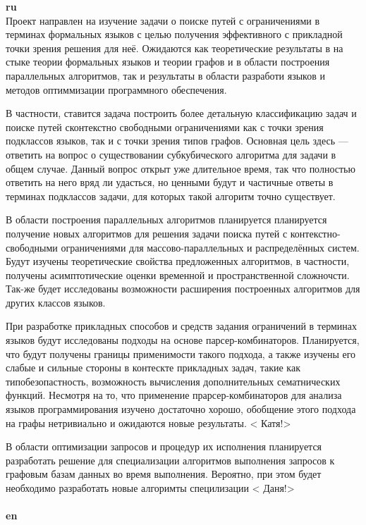 \documentclass[12pt]{article}  %
\theoremstyle{remark}
\begin{document}
\textbf{ru}\\
%
Проект направлен на изучение задачи о поиске путей с ограничениями в терминах формальных языков с целью получения эффективного с прикладной точки зрения решения для неё.
Ожидаются как теоретические результаты в на стыке теории формальных языков и теории графов и в области построения параллельных алгоритмов, так и результаты в области разработи языков и методов оптиммизации программного обеспечения.

В частности, ставится задача построить более детальную классификацию задач и поиске путей сконтекстно свободными ограничениями как с точки зрения подклассов языков, так и с точки зрения типов графов.
Основная цель здесь --- ответить на вопрос о существовании субкубического алгоритма для задачи в общем случае.
Данный вопрос открыт уже длительное время, так что полностью ответить на него вряд ли удасться, но ценными будут и частичные ответы в терминах подклассов задачи, для которых такой алгоритм точно существует.

В области построения параллельных алгоритмов планируется планируется получение новых алгоритмов для решения задачи поиска путей с контекстно-свободными ограничениями для массово-параллельных и распределённых систем.
Будут изучены теоретические свойства предложенных алгоритмов, в частности, получены асимптотические оценки временной и пространственной сложночсти.
Так-же будет исследованы возможности расширения построенных алгоритмов для других классов языков.

При разработке прикладных способов и средств задания ограничений в терминах языков будут исследованы подходы на основе парсер-комбинаторов.
Планируется, что будут получены границы применимости такого подхода, а также изучены его слабые и сильные стороны в контескте прикладных задач, такие как типобезопастность, возможность вычисления дополнительных сематнических функций. Несмотря на то, что применение прарсер-комбинаторов для анализа языков программирования изучено достаточно хорошо, обобщение этого подхода на графы нетривиально и ожидаются новые результаты. {\huge< Катя!>}

В области оптимизации запросов и процедур их исполнения планируется разработать решение для специализации алгоритмов выполнения запросов к графовым базам данных во время выполнения. Вероятно, при этом будет необходимо разработать новые алгоримты специлизации {\huge< Даня!>}
\\
\\
\textbf{en}\\
\end{document}
